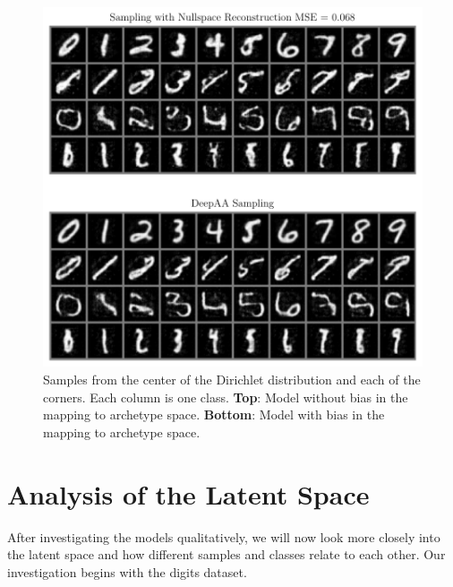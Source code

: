\begin{figure}[htpb]
	\centering
        \includegraphics{figures/samples/aa_nullspace_bias_y.pdf}
        \caption{Samples from the center of the Dirichlet distribution and each
        of the corners. Each column is one class. \textbf{Top}: Model without bias in
        the mapping to archetype space. \textbf{Bottom}: Model with bias in the mapping to
        archetype space.}%
        \label{fig:aa_nullspace_bias}
\end{figure}

\section{Analysis of the Latent Space}%
\label{sec:analysis_of_the_latent_space}

After investigating the models qualitatively, we will now look more closely
into the latent space and how different samples and classes relate to each
other. Our investigation begins with the digits dataset.

